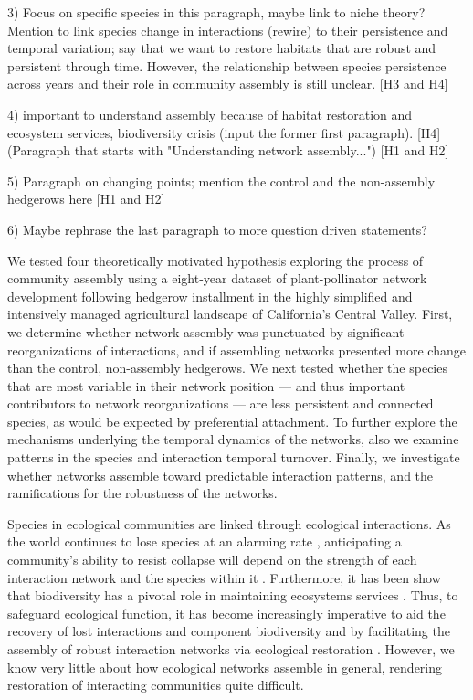\documentclass[12pt]{article}
\begin{document}
3) Focus on specific species in this paragraph, maybe link to niche theory? Mention \cite{kaiser2010robustness, macleod2016measuring} to link species change in interactions (rewire) to their persistence and temporal variation; say that we want to restore habitats that are robust and persistent through time. However, the relationship between species persistence across years and their role in community assembly is still unclear.  [H3 and H4]

4) important to understand assembly because of habitat restoration and ecosystem services, biodiversity crisis (input the former first paragraph). [H4] (Paragraph that starts with "Understanding network assembly...")  [H1 and H2]

5) Paragraph on changing points; mention the control and the non-assembly hedgerows here [H1 and H2]

6) Maybe rephrase the last paragraph to more question driven statements?


We tested four theoretically motivated hypothesis exploring the process of community assembly using a eight-year
dataset of plant-pollinator network development following hedgerow
installment in the highly simplified and intensively managed
agricultural landscape of California's Central Valley. First,
we determine whether network assembly was punctuated by significant
reorganizations of interactions, and if assembling networks presented more change than the control, non-assembly hedgerows. We next tested whether the species
that are most variable in their network position --- and thus
important contributors to network reorganizations --- are less
persistent and connected species, as would be expected by preferential
attachment. To further explore the mechanisms underlying the temporal
dynamics of the networks, also we examine patterns in the species and
interaction temporal turnover. Finally, we investigate whether
networks assemble toward predictable interaction patterns, and the
ramifications for the robustness of the networks. 

Species in ecological communities are linked through ecological
interactions. As the world continues to lose species at an alarming
rate \citep{dunn2009sixth, barnosky2011has}, anticipating a
community's ability to resist collapse will depend on the strength of
each interaction network and the species within it \citep{Memmott2004,
  Rezende2007, Bascompte2009, Thebault2010}. Furthermore, it has been
show that biodiversity has a pivotal role in maintaining ecosystems
services \citep{cardinale-2012-59}. Thus, to safeguard ecological
function, it has become increasingly imperative to aid the recovery of
lost interactions and component biodiversity and by facilitating the
assembly of robust interaction networks via ecological restoration
\citep{menz-2010-4}. However, we know very little about how ecological
networks assemble in general, rendering restoration of interacting
communities quite difficult.
\end{document}
